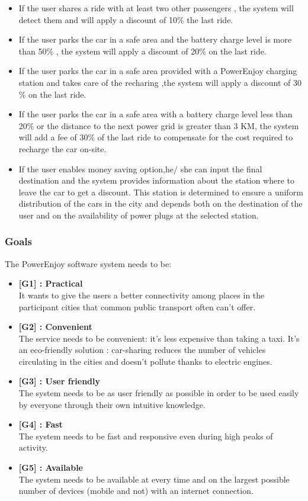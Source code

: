\documentclass[12pt]{article}
\begin{document}
	\begin{itemize}
		\item If the user shares a ride with at least two other passengers , the system will 
			  detect them and will apply a discount of 10\% the last ride.
		\item If the user parks the car in a safe area and the battery charge level is more 
			  than 50\% , the system will apply a discount of 20\% on the last ride.
		\item If the user parks the car in a safe area provided with a PowerEnjoy charging 
			  station and takes care of the recharing ,the system will apply a discount of 30
			  \% on the last ride.
		\item If the user parks the car in a safe area with a battery charge level less than 	
			  20\% or the distance to the next power grid is greater than 3 KM, the system 
			  will add a fee of 30\% of the last ride to compensate for the cost required to 
			  recharge the car on-site.
		\item If the user enables money saving option,he/ she can input the final destination 	
			  and the system provides information about the station where to leave the car to 
			  get a discount. This station is determined to ensure a uniform distribution of 
			  the cars in the city and depends both on the destination of the user and on the 
			  availability of power plugs at the selected station.
	\end{itemize}
	
	\subsubsection{Goals}
		The PowerEnjoy software system needs to be:
	\begin{itemize}
		\item \textbf{[G1] : Practical}\\It wants to give the users a better connectivity among 
					 places in the participant cities that common public transport often can't 
					 offer.
		\item \textbf{[G2] : Convenient}\\The service needs to be convenient: it's less 
					 expensive than taking a taxi. It's an eco-friendly solution : car-sharing 
					 reduces the number of vehicles circulating in the cities and doesn't 
					 pollute thanks to electric engines.
		\item \textbf{[G3] : User friendly}\\ The system needs to be as user friendly as 
				     possible in order to be used easily by everyone through their own 
				     intuitive knowledge. 
		\item \textbf{[G4] : Fast}\\ The system needs to be fast and responsive even during 
					 high peaks of activity.
		\item \textbf{[G5] : Available}\\ The system needs to be available at every time and on 
					 the largest possible number of devices (mobile and not) with an internet 
					 connection.
	\end{itemize}
	
\end{document}
